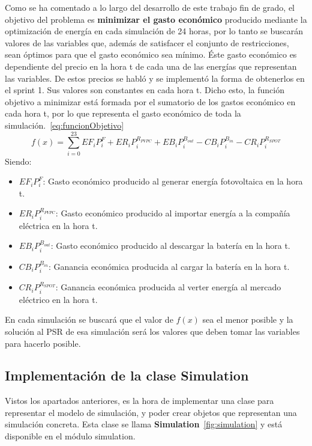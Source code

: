 Como se ha comentado a lo largo del desarrollo de este trabajo fin de grado, el objetivo del problema es \textbf{minimizar el gasto económico} producido mediante la optimización de energía en cada simulación de 24 horas, por lo tanto se buscarán valores de las variables que, además de satisfacer el conjunto de restricciones, sean óptimos para que el gasto económico sea mínimo. Éste gasto económico es dependiente del precio en la hora t de cada una de las energías que representan las variables. De estos precios se habló y se implementó la forma de obtenerlos en el sprint 1. Sus valores son constantes en cada hora t. Dicho esto, la función objetivo a minimizar está formada por el sumatorio de los gastos económico en cada hora t, por lo que representa el gasto económico de toda la simulación.~\ref{eq:funcionObjetivo}
\begin{equation}
\label{eq:funcionObjetivo}
f(x) = \sum_{i=0}^{23} EF_{i}P_{i}^{F} + ER_{i}P_{i}^{R_{PVPC}} + EB_{i}P_{i}^{B_{out}} - CB_{i}P_{i}^{B_{in}} - CR_{i}P_{i}^{R_{SPOT}}
\end{equation}
Siendo:
\begin{itemize}
\item $ EF_{i}P_{i}^{F} $: Gasto económico producido al generar energía fotovoltaica en la hora t.
\item $ ER_{i}P_{i}^{R_{PVPC}} $: Gasto económico producido al importar energía a la compañía eléctrica en la hora t.
\item $ EB_{i}P_{i}^{B_{out}} $: Gasto económico producido al descargar la batería en la hora t.
\item $ CB_{i}P_{i}^{B_{in}} $: Ganancia económica producida al cargar la batería en la hora t.
\item $ CR_{i}P_{i}^{R_{SPOT}} $: Ganancia económica producida al verter energía al mercado eléctrico en la hora t.
\end{itemize}

En cada simulación se buscará que el valor de $ f(x) $ sea el menor posible y la solución al PSR de esa simulación será los valores que deben tomar las variables para hacerlo posible.

\subsection{Implementación de la clase Simulation}
Vistos los apartados anteriores, es la hora de implementar una clase para representar el modelo de simulación, y poder crear objetos que representan una simulación concreta. Esta clase se llama \textbf{Simulation}~\ref{fig:simulation} y está disponible en el módulo simulation.\\

